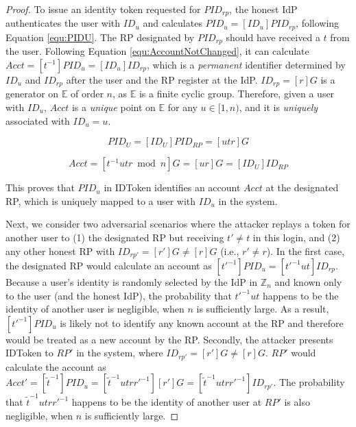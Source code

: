   \begin{proof}
    To issue an identity token requested for $PID_{rp}$, the 
    honest IdP authenticates the user with $ID_u$ and calculates 
    $PID_u = [ID_u]PID_{rp}$, following Equation \ref{equ:PIDU}. 
    The RP designated by $PID_{rp}$ should have received a $t$ 
    from the user. Following Equation \ref{equ:AccountNotChanged}, 
    it can calculate $Acct = [t^{-1}]PID_{u} = [ID_u]ID_{rp}$, 
    which is a \emph{permanent} identifier determined by $ID_u$ 
    and $ID_{rp}$ after the user and the RP register at the IdP. 
    $ID_{rp} = [r]G$ is a generator on $\mathbb{E}$ of order $n$, 
    as $\mathbb{E}$ is a finite cyclic group. Therefore, given a 
    user with $ID_u$, $Acct$ is a \emph{unique} point on 
    $\mathbb{E}$ for any $u \in [1, n)$, and it is \emph{uniquely} 
    associated with $ID_u=u$. 
    
    \begin{equation}
      PID_{U} = [{ID_U}]{PID_{RP}} = [utr]G
       \label{equ:PIDU}
    \end{equation}
  
    \begin{equation}
      Acct =  [t^{-1}utr \bmod n]G = [ur]G = [ID_U]ID_{RP}
      \label{equ:AccountNotChanged}
    \end{equation}
  
    This proves that $PID_u$ in IDToken identifies an account 
    $Acct$ at the designated RP, which is uniquely mapped to a 
    user with $ID_u$ in the system.
  
    Next, we consider two adversarial scenarios where the 
    attacker replays a token for another user to (1) the 
    designated RP but receiving $t'\neq t$ in this login, and 
    (2) any other honest RP with $ID_{rp'} = [r']G \neq [r]G$ 
    (i.e., $r' \neq r$). In the first case, the designated RP 
    would calculate an account as $[t'^{-1}]PID_u = [t'^{-1}ut]ID_{rp}$.
    Because a user's identity is randomly selected by the IdP 
    in $\mathbb{Z}_n$ and known only to the user (and the honest 
    IdP), the probability that $t'^{-1}ut$ happens to be the 
    identity of another user is negligible, when $n$ is 
    sufficiently large. As a result, $[t'^{-1}]PID_u$ is likely 
    not to identify any known account at the RP and therefore 
    would be treated as a new account by the RP. 
    Secondly, the attacker presents IDToken to $RP'$ in the 
    system, where $ID_{rp'} = [r']G \neq [r]G$. $RP'$ would 
    calculate the account as $Acct' = [\tilde{t}^{-1}]PID_{u} = 
    [\tilde{t}^{-1}utrr'^{-1}][r']G = 
    [\tilde{t}^{-1}utrr'^{-1}]ID_{rp'}$. 
    The probability that $\tilde{t}^{-1}utrr'^{-1}$ happens to 
    be the identity of another user at $RP'$ is also negligible, 
    when $n$ is sufficiently large. 
  \end{proof}
  
